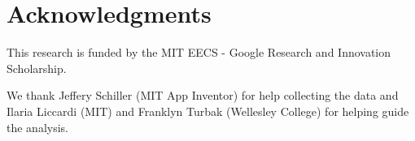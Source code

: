 \documentclass[conference]{IEEEtran}
\begin{document}
\section*{Acknowledgments}

This research is funded by the MIT EECS - Google Research and Innovation Scholarship. 

We thank Jeffery Schiller (MIT App Inventor) for help collecting the data and Ilaria Liccardi (MIT) and Franklyn Turbak (Wellesley College) for helping guide the analysis.




%
%
%

\newpage





%
%
\end{document}

